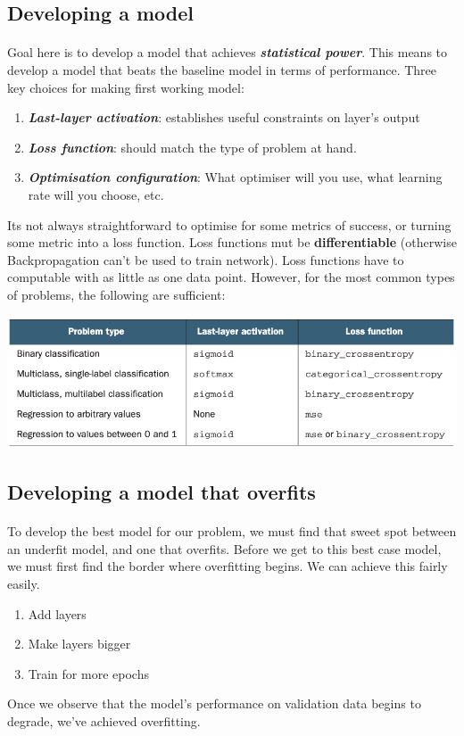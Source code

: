 \documentclass[12pt, a4paper]{article}
\begin{document}
\subsection{Developing a model}
\paragraph*{}
Goal here is to develop a model that achieves \textbf{\textit{statistical power}}.
This means to develop a model that beats the baseline model in terms of performance.
Three key choices for making first working model:

\begin{enumerate}
   \item \textbf{\textit{Last-layer activation}}: establishes useful constraints on layer's output 
   \item \textbf{\textit{Loss function}}: should match the type of problem at hand.
   \item \textbf{\textit{Optimisation configuration}}: What optimiser will you use, what learning rate will you choose, etc.
\end{enumerate}

Its not always straightforward to optimise for some metrics of success, or turning
some metric into a loss function. Loss functions mut be \textbf{differentiable} 
(otherwise Backpropagation can't be used to train network). Loss functions have to computable with 
as little as one data point. However, for the most common types of problems, the
following are sufficient: \\

{
   \centering
   \includegraphics[width=15cm]{loss_funcs_per_problem.png}

}


\subsection{Developing a model that overfits}
\paragraph*{}
To develop the best model for our problem, we must find that sweet spot 
between an underfit model, and one that overfits. Before we get to this 
best case model, we must first find the border where overfitting begins.
We can achieve this fairly easily.
\begin{enumerate}
   \item Add layers 
   \item Make layers bigger
   \item Train for more epochs
\end{enumerate}
Once we observe that the model's performance on validation data begins to degrade,
we've achieved overfitting.
\end{document}
